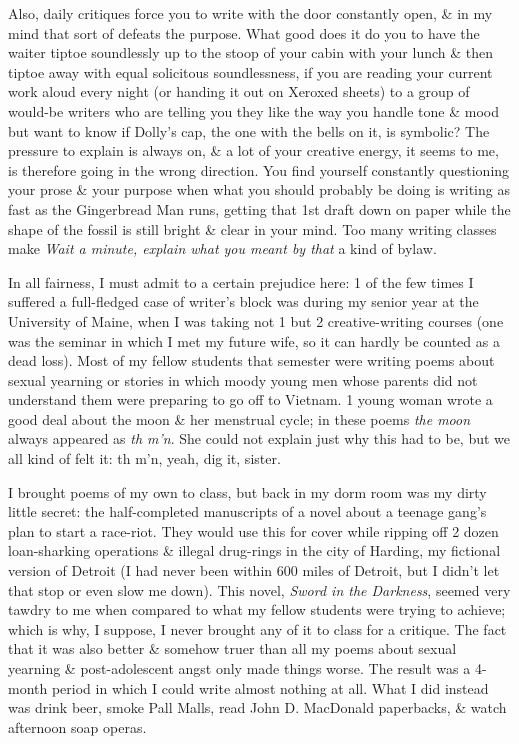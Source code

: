 \documentclass{article}
\numberwithin{equation}{section}
\begin{document}
Also, daily critiques force you to write with the door constantly open, \& in my mind that sort of defeats the purpose. What good does it do you to have the waiter tiptoe soundlessly up to the stoop of your cabin with your lunch \& then tiptoe away with equal solicitous soundlessness, if you are reading your current work aloud every night (or handing it out on Xeroxed sheets) to a group of would-be writers who are telling you they like the way you handle tone \& mood but want to know if Dolly's cap, the one with the bells on it, is symbolic? The pressure to explain is always on, \& a lot of your creative energy, it seems to me, is therefore going in the wrong direction. You find yourself constantly questioning your prose \& your purpose when what you should probably be doing is writing as fast as the Gingerbread Man runs, getting that 1st draft down on paper while the shape of the fossil is still bright \& clear in your mind. Too many writing classes make \textit{Wait a minute, explain what you meant by that} a kind of bylaw.

In all fairness, I must admit to a certain prejudice here: 1 of the few times I suffered a full-fledged case of writer's block was during my senior year at the University of Maine, when I was taking not 1 but 2 creative-writing courses (one was the seminar in which I met my future wife, so it can hardly be counted as a dead loss). Most of my fellow students that semester were writing poems about sexual yearning or stories in which moody young men whose parents did not understand them were preparing to go off to Vietnam. 1 young woman wrote a good deal about the moon \& her menstrual cycle; in these poems \textit{the moon} always appeared as \textit{th m'n}. She could not explain just why this had to be, but we all kind of felt it: th m'n, yeah, dig it, sister.

I brought poems of my own to class, but back in my dorm room was my dirty little secret: the half-completed manuscripts of a novel about a teenage gang's plan to start a race-riot. They would use this for cover while ripping off 2 dozen loan-sharking operations \& illegal drug-rings in the city of Harding, my fictional version of Detroit (I had never been within 600 miles of Detroit, but I didn't let that stop or even slow me down). This novel, \textit{Sword in the Darkness}, seemed very tawdry to me when compared to what my fellow students were trying to achieve; which is why, I suppose, I never brought any of it to class for a critique. The fact that it was also better \& somehow truer than all my poems about sexual yearning \& post-adolescent angst only made things worse. The result was a 4-month period in which I could write almost nothing at all. What I did instead was drink beer, smoke Pall Malls, read John D. MacDonald paperbacks, \& watch afternoon soap operas.
\end{document}
